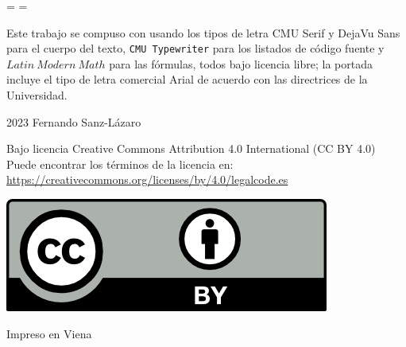\font=\origiwspc%
\font=\origiwstr%
\newpage
\thispagestyle{empty}
\begin{center}
	\strut\vspace{60ex}
	
	\strut
	\begin{small}
	\begin{minipage}{\linewidth}
		Este trabajo se compuso con \XeLaTeX{} usando los tipos de letra CMU Serif y {\footnotesize\DVS{}DejaVu Sans} para el cuerpo del texto,  \texttt{CMU Typewriter} para los listados de código fuente y $Latin\ Modern\ Math$ para las fórmulas, todos bajo licencia libre; la portada incluye el tipo de letra comercial {\small\Arial{}Arial} de acuerdo con las directrices de la Universidad.
		\end{minipage}
	\vfill
		\textcopyright{} 2023 Fernando Sanz-Lázaro
		
		Bajo licencia Creative Commons Attribution 4.0 International (CC BY 4.0)\\
		
		Puede encontrar los términos de la licencia en:\\ \url{https://creativecommons.org/licenses/by/4.0/legalcode.es}
		
		\includegraphics{images/by.png}
		
		Impreso en Viena
	\end{small}\end{center}\newpage
